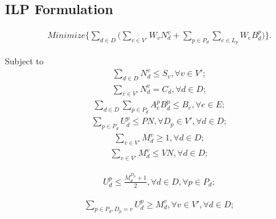 \documentclass[conference]{IEEEtran}\IEEEoverridecommandlockouts
\begin{document}
 \subsection{ILP Formulation}\label{ILP Formulation}

\begin{eqnarray}\label{objective}
   Minimize\Big\{\sum\limits_{d \in D}\Big(\sum\limits_{v \in V'}W_{v}N_{d}^{v}+\sum\limits_{p\in P_{d}}\sum\limits_{e \in L_{p}}W_{e}B_{d}^{p}\Big)\Big\}.
  \end{eqnarray}



 Subject to
 \begin{eqnarray}\label{Constraint 1}
\sum\limits_{d \in D}N_{d}^{v} \leq S_{v}, \forall v \in V';
 \end{eqnarray}
  \begin{eqnarray}\label{Constraint 2}
\sum\limits_{v \in V'}N_{d}^{v} = C_{d}, \forall d \in D;
 \end{eqnarray}
 \begin{eqnarray}\label{Constraint 3}
\sum\limits_{d \in D}\sum\limits_{p \in P_{d}}A_{e}^{p}B_{d}^{p} \leq B_{e}, \forall e \in E;
 \end{eqnarray}
 \begin{eqnarray}\label{Constraint 4}
 \sum\limits_{p\in P_{d}}U_{d}^{p}\leq PN, \forall D_{p} \in V', \forall d \in D;
 \end{eqnarray}
 \begin{eqnarray}\label{Constraint 5}
\sum\limits_{v \in V'}M_{d}^{v}\geq 1, \forall d \in D;
 \end{eqnarray}
   \begin{eqnarray}\label{Constraint 6}
\sum\limits_{v \in V'}M_{d}^{v}\leq VN, \forall d \in D;
 \end{eqnarray}



  \begin{eqnarray}\label{Constraint 7}
 U_{d}^{p}\leq \frac{M_{d}^{D_{p}}+1}{2}, \forall d \in D, \forall p \in P_{d};
 \end{eqnarray}


  \begin{eqnarray}\label{Constraint 8}
 \sum\limits_{ p \in P_{d}, D_{p}=v}U_{d}^{p}\geq M_{d}^{v}, \forall v \in V', \forall d \in D;
 \end{eqnarray}
\end{document}

